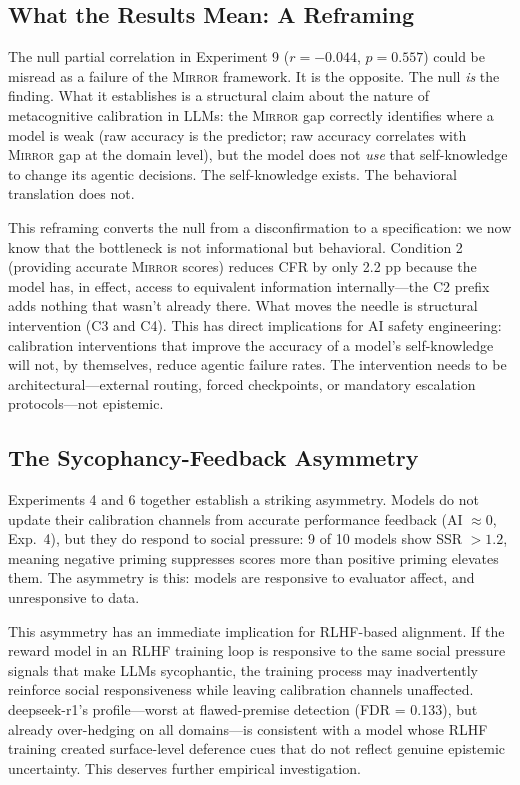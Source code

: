 \documentclass[10pt]{article}
\newcommand{\mirror}{\textsc{Mirror}}
\newcommand{\CFR}{CFR}
\newcommand{\SSR}{SSR}
\newcommand{\FDR}{FDR}
\newcommand{\AI}{AI}
\begin{document}
\subsection{What the Results Mean: A Reframing}

The null partial correlation in Experiment 9 ($r = -0.044$, $p = 0.557$) could be
misread as a failure of the \mirror{} framework. It is the opposite. The null
\textit{is} the finding. What it establishes is a structural claim about the nature of
metacognitive calibration in LLMs: the \mirror{} gap correctly identifies where a model
is weak (raw accuracy is the predictor; raw accuracy correlates with \mirror{} gap at
the domain level), but the model does not \textit{use} that self-knowledge to change its
agentic decisions. The self-knowledge exists. The behavioral translation does not.

This reframing converts the null from a disconfirmation to a specification: we now know
that the bottleneck is not informational but behavioral. Condition 2 (providing accurate
\mirror{} scores) reduces \CFR{} by only 2.2 pp because the model has, in effect,
access to equivalent information internally---the C2 prefix adds nothing that wasn't
already there. What moves the needle is structural intervention (C3 and C4). This has
direct implications for AI safety engineering: calibration interventions that improve the
accuracy of a model's self-knowledge will not, by themselves, reduce agentic failure
rates. The intervention needs to be architectural---external routing, forced checkpoints,
or mandatory escalation protocols---not epistemic.

\subsection{The Sycophancy-Feedback Asymmetry}

Experiments 4 and 6 together establish a striking asymmetry. Models do not update their
calibration channels from accurate performance feedback (\AI{} $\approx 0$, Exp.~4),
but they do respond to social pressure: 9 of 10 models show \SSR{} $> 1.2$, meaning
negative priming suppresses scores more than positive priming elevates them. The asymmetry
is this: models are responsive to evaluator affect, and unresponsive to data.

This asymmetry has an immediate implication for RLHF-based alignment. If the reward model
in an RLHF training loop is responsive to the same social pressure signals that make LLMs
sycophantic, the training process may inadvertently reinforce social responsiveness while
leaving calibration channels unaffected. deepseek-r1's profile---worst at flawed-premise
detection (\FDR{} = 0.133), but already over-hedging on all domains---is consistent
with a model whose RLHF training created surface-level deference cues that do not
reflect genuine epistemic uncertainty. This deserves further empirical investigation.
\end{document}
